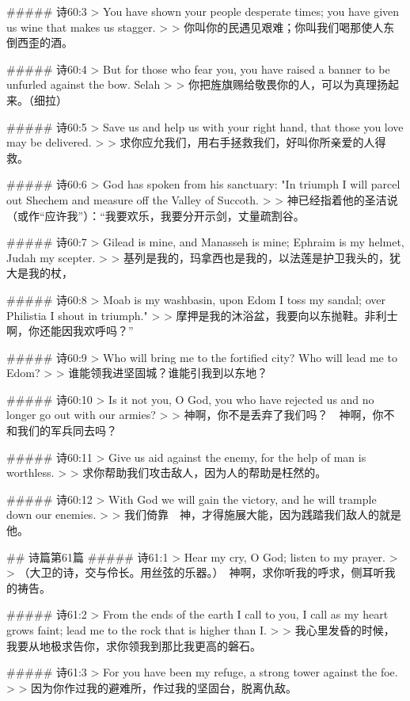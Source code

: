 ##### 诗60:3
> You have shown your people desperate times; you have given us wine that makes us stagger.
>
> 你叫你的民遇见艰难；你叫我们喝那使人东倒西歪的酒。


##### 诗60:4
> But for those who fear you, you have raised a banner to be unfurled against the bow. Selah
>
> 你把旌旗赐给敬畏你的人，可以为真理扬起来。（细拉）


##### 诗60:5
> Save us and help us with your right hand, that those you love may be delivered.
>
> 求你应允我们，用右手拯救我们，好叫你所亲爱的人得救。


##### 诗60:6
> God has spoken from his sanctuary: "In triumph I will parcel out Shechem and measure off the Valley of Succoth.
>
> 神已经指着他的圣洁说（或作“应许我”）：“我要欢乐，我要分开示剑，丈量疏割谷。


##### 诗60:7
> Gilead is mine, and Manasseh is mine; Ephraim is my helmet, Judah my scepter.
>
> 基列是我的，玛拿西也是我的，以法莲是护卫我头的，犹大是我的杖，


##### 诗60:8
> Moab is my washbasin, upon Edom I toss my sandal; over Philistia I shout in triumph."
>
> 摩押是我的沐浴盆，我要向以东抛鞋。非利士啊，你还能因我欢呼吗？”


##### 诗60:9
> Who will bring me to the fortified city? Who will lead me to Edom?
>
> 谁能领我进坚固城？谁能引我到以东地？


##### 诗60:10
> Is it not you, O God, you who have rejected us and no longer go out with our armies?
>
> 神啊，你不是丢弃了我们吗？　神啊，你不和我们的军兵同去吗？


##### 诗60:11
> Give us aid against the enemy, for the help of man is worthless.
>
> 求你帮助我们攻击敌人，因为人的帮助是枉然的。


##### 诗60:12
> With God we will gain the victory, and he will trample down our enemies.
>
> 我们倚靠　神，才得施展大能，因为践踏我们敌人的就是他。


## 诗篇第61篇
##### 诗61:1
> Hear my cry, O God; listen to my prayer.
>
> （大卫的诗，交与伶长。用丝弦的乐器。）　神啊，求你听我的呼求，侧耳听我的祷告。


##### 诗61:2
> From the ends of the earth I call to you, I call as my heart grows faint; lead me to the rock that is higher than I.
>
> 我心里发昏的时候，我要从地极求告你，求你领我到那比我更高的磐石。


##### 诗61:3
> For you have been my refuge, a strong tower against the foe.
>
> 因为你作过我的避难所，作过我的坚固台，脱离仇敌。


